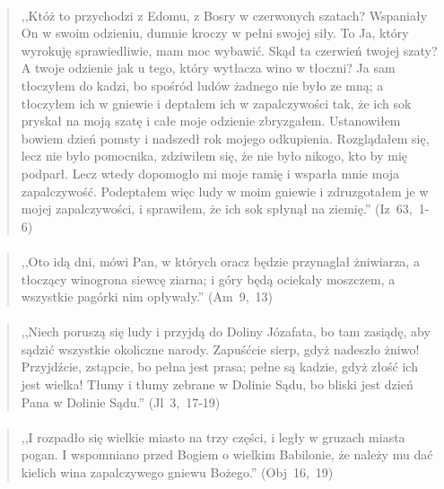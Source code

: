 \documentclass[10pt,a4paper,oneside]{article}
\begin{document}
\paragraph{}
\begin{quote}
,,Któż to przychodzi z Edomu, z Bosry w czerwonych szatach? Wspaniały On w swoim odzieniu, dumnie kroczy w pełni swojej siły. To Ja, który wyrokuję sprawiedliwie, mam moc wybawić. Skąd ta czerwień twojej szaty? A twoje odzienie jak u tego, który wytłacza wino w tłoczni? Ja sam tłoczyłem do kadzi, bo spośród ludów żadnego nie było ze mną; a tłoczyłem ich w gniewie i deptałem ich w zapalczywości tak, że ich sok pryskał na moją szatę i całe moje odzienie zbryzgałem. Ustanowiłem bowiem dzień pomsty i nadszedł rok mojego odkupienia. Rozglądałem się, lecz nie było pomocnika, zdziwiłem się, że nie było nikogo, kto by mię podparł. Lecz wtedy dopomogło mi moje ramię i wsparła mnie moja zapalczywość. Podeptałem więc ludy w moim gniewie i zdruzgotałem je w mojej zapalczywości, i sprawiłem, że ich sok spłynął na ziemię.'' \mbox{(Iz 63, 1-6)}
\end{quote}
\paragraph{}
\begin{quote}
,,Oto idą dni, mówi Pan, w których oracz będzie przynaglał żniwiarza, a tłoczący winogrona siewcę ziarna; i góry będą ociekały moszczem, a wszystkie pagórki nim opływały.'' \mbox{(Am 9, 13)}
\end{quote}
\paragraph{}
\begin{quote}
,,Niech poruszą się ludy i przyjdą do Doliny Józafata, bo tam zasiądę, aby sądzić wszystkie okoliczne narody. Zapuśćcie sierp, gdyż nadeszło żniwo! Przyjdźcie, zstąpcie, bo pełna jest prasa; pełne są kadzie, gdyż złość ich jest wielka! Tłumy i tłumy zebrane w Dolinie Sądu, bo bliski jest dzień Pana w Dolinie Sądu.'' \mbox{(Jl 3, 17-19)}
\end{quote}
\paragraph{}
\begin{quote}
,,I rozpadło się wielkie miasto na trzy części, i legły w gruzach miasta pogan. I wspomniano przed Bogiem o wielkim Babilonie, że należy mu dać kielich wina zapalczywego gniewu Bożego.'' \mbox{(Obj 16, 19)}
\end{quote}
\end{document}
